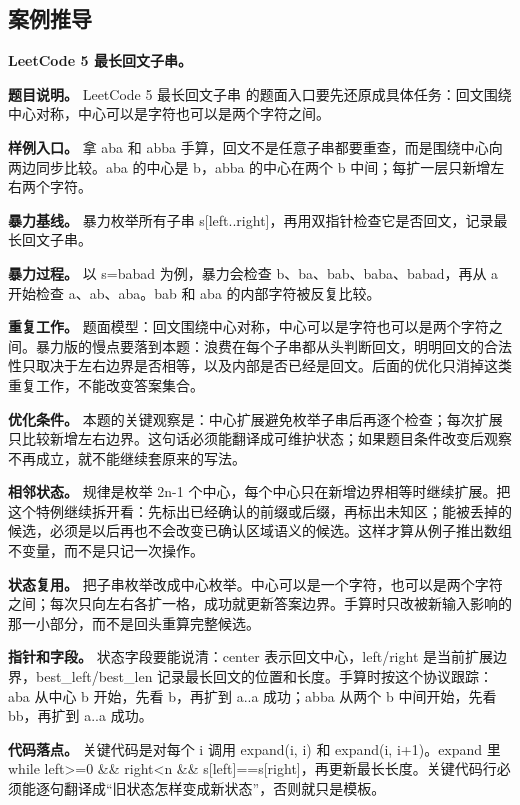 \subsection{案例推导}

\noindent\textbf{LeetCode 5 最长回文子串。}

\textbf{题目说明。} LeetCode 5 最长回文子串 的题面入口要先还原成具体任务：回文围绕中心对称，中心可以是字符也可以是两个字符之间。

\textbf{样例入口。} 拿 aba 和 abba 手算，回文不是任意子串都要重查，而是围绕中心向两边同步比较。aba 的中心是 b，abba 的中心在两个 b 中间；每扩一层只新增左右两个字符。

\textbf{暴力基线。} 暴力枚举所有子串 s[left..right]，再用双指针检查它是否回文，记录最长回文子串。

\textbf{暴力过程。} 以 s=babad 为例，暴力会检查 b、ba、bab、baba、babad，再从 a 开始检查 a、ab、aba。bab 和 aba 的内部字符被反复比较。

\textbf{重复工作。} 题面模型：回文围绕中心对称，中心可以是字符也可以是两个字符之间。暴力版的慢点要落到本题：浪费在每个子串都从头判断回文，明明回文的合法性只取决于左右边界是否相等，以及内部是否已经是回文。后面的优化只消掉这类重复工作，不能改变答案集合。

\textbf{优化条件。} 本题的关键观察是：中心扩展避免枚举子串后再逐个检查；每次扩展只比较新增左右边界。这句话必须能翻译成可维护状态；如果题目条件改变后观察不再成立，就不能继续套原来的写法。

\textbf{相邻状态。} 规律是枚举 2n-1 个中心，每个中心只在新增边界相等时继续扩展。把这个特例继续拆开看：先标出已经确认的前缀或后缀，再标出未知区；能被丢掉的候选，必须是以后再也不会改变已确认区域语义的候选。这样才算从例子推出数组不变量，而不是只记一次操作。

\textbf{状态复用。} 把子串枚举改成中心枚举。中心可以是一个字符，也可以是两个字符之间；每次只向左右各扩一格，成功就更新答案边界。手算时只改被新输入影响的那一小部分，而不是回头重算完整候选。

\textbf{指针和字段。} 状态字段要能说清：center 表示回文中心，left/right 是当前扩展边界，best\_left/best\_len 记录最长回文的位置和长度。手算时按这个协议跟踪：aba 从中心 b 开始，先看 b，再扩到 a..a 成功；abba 从两个 b 中间开始，先看 bb，再扩到 a..a 成功。

\textbf{代码落点。} 关键代码是对每个 i 调用 expand(i, i) 和 expand(i, i+1)。expand 里 while left>=0 \&\& right<n \&\& s[left]==s[right]，再更新最长长度。关键代码行必须能逐句翻译成“旧状态怎样变成新状态”，否则就只是模板。

